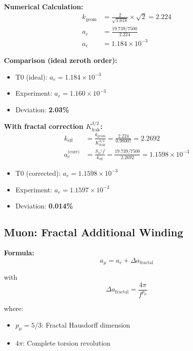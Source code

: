 	\textbf{Numerical Calculation:}
	\begin{align}
		k_{\text{geom}} &= \frac{2}{\sqrt{1.618}} \times \sqrt{2} = 2.224 \\
		a_e &= \frac{19.739 / 7500}{2.224} \\
		a_e &= 1.184 \times 10^{-3}
	\end{align}
	
	\textbf{Comparison (ideal zeroth order):}
	\begin{itemize}
		\item T0 (ideal): $a_e = 1.184 \times 10^{-3}$
		\item Experiment: $a_e = 1.160 \times 10^{-3}$
		\item Deviation: \textbf{2.03\%}
	\end{itemize}
	
	\textbf{With fractal correction $K_\text{frak}^{3/2}$:}
	\begin{align}
		k_\text{eff} &= \frac{k_\text{geom}}{K_\text{frak}^{3/2}} = \frac{2.224}{0.98007} = 2.2692 \\
		a_e^\text{(corr)} &= \frac{S_3/f}{k_\text{eff}} = \frac{19.739/7500}{2.2692} = 1.1598 \times 10^{-3}
	\end{align}
	\begin{itemize}
		\item T0 (corrected): $a_e = 1.1598 \times 10^{-3}$
		\item Experiment: $a_e = 1.1597 \times 10^{-3}$
		\item Deviation: \textbf{0.014\%}
	\end{itemize}
	
	\subsection{Muon: Fractal Additional Winding}
	
	\textbf{Formula:}
	\begin{equation}
		a_\mu = a_e + \Delta a_{\text{fractal}}
		\label{eq:amu}
	\end{equation}
	
	with
	\begin{equation}
		\Delta a_{\text{fractal}} = \frac{4\pi}{f^{p_\mu}}
		\label{eq:delta_mu}
	\end{equation}
	
	where:
	\begin{itemize}
		\item $p_\mu = 5/3$: Fractal Hausdorff dimension
		\item $4\pi$: Complete torsion revolution
	\end{itemize}
	

